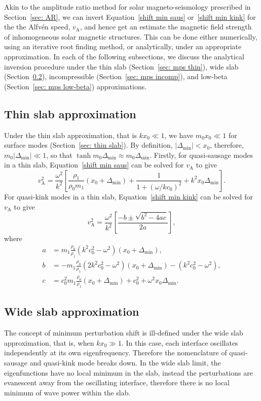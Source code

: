 \documentclass[12pt]{../style-files/ociamthesis}
\begin{document}
Akin to the amplitude ratio method for solar magneto-seismology prescribed in Section~\ref{sec: AR}, we can invert Equation~\eqref{shift min saus} or~\eqref{shift min kink} for the the Alfv\'{e}n speed, $v_\textrm{A}$, and hence get an estimate the magnetic field strength of inhomogeneous solar magnetic structures. This can be done either numerically, using an iterative root finding method, or analytically, under an appropriate approximation. In each of the following subsections, we discuss the analytical inversion procedure under the thin slab (Section~\ref{sec: mps thin}), wide slab (Section~\ref{sec: mps wide}), incompressible (Section~\ref{sec: mps incomp}), and low-beta (Section~\ref{sec: mps low-beta}) approximations.


\subsection{Thin slab approximation} \label{sec: MPS thin}
Under the thin slab approximation, that is $kx_0 \ll 1$, we have $m_0x_0 \ll 1$ for surface modes (Section~\ref{sec: thin slab}). By definition, $|\Delta_\textrm{min}| < x_0$, therefore, $m_0|\Delta_\textrm{min}| \ll 1$, so that $\tanh{m_0\Delta_\textrm{min}} \approx m_0\Delta_\textrm{min}$. Firstly, for quasi-sausage modes in a thin slab, Equation~\eqref{shift min saus} can be solved for $v_\textrm{A}$ to give
\begin{equation}
v_\textrm{A}^2 = \frac{\omega^2}{k^2} \left[\frac{\rho_1}{\rho_0m_1}(x_0 + \Delta_\textrm{min}) + \frac{1}{1 + (\omega / kc_0)^2} + k^2x_0\Delta_\textrm{min}\right].
\end{equation}
For quasi-kink modes in a thin slab, Equation~\eqref{shift min kink} can be solved for $v_\textrm{A}$ to give
\begin{equation}
v_\textrm{A}^2 = \frac{\omega^2}{k^2}\left[\frac{-b \pm \sqrt{b^2 - 4ac}}{2a}\right],
\end{equation}
where
\begin{align}
a &= m_1\frac{\rho_0}{\rho_1}(k^2c_0^2 - \omega^2)(x_0 + \Delta_\textrm{min}), \\
b &= -m_1\frac{\rho_0}{\rho_1}(2k^2c_0^2 - \omega^2)(x_0 + \Delta_\textrm{min}) - (k^2c_0^2 - \omega^2), \\
c &= c_0^2m_1\frac{\rho_0}{\rho_1}(x_0 + \Delta_\textrm{min}) + c_0^2 + \omega^2x_0\Delta_\textrm{min}.
\end{align}


\subsection{Wide slab approximation} \label{sec: mps wide}
The concept of minimum perturbation shift is ill-defined under the wide slab approximation, that is, when $kx_0 \gg 1$. In this case, each interface oscillates independently at its own eigenfrequency. Therefore the nomenclature of quasi-sausage and quasi-kink mode breaks down. In the wide slab limit, the eigenfunctions have no local minimum in the slab, instead the perturbations are evanescent away from the oscillating interface, therefore there is no local minimum of wave power within the slab.
\end{document}
